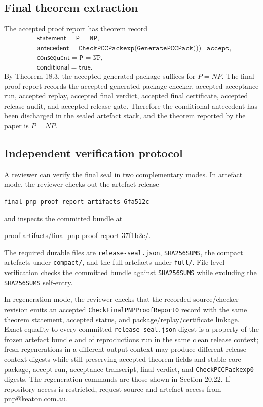 \documentclass[10.5pt,a4paper]{article}
\begin{document}
\subsection{Final theorem extraction}
The accepted proof report has theorem record
\[
\begin{aligned}
&\mathsf{statement}=\texttt{P = NP},\\
&\mathsf{antecedent}=\texttt{CheckPCCPackexp(GeneratePCCPack())=accept},\\
&\mathsf{consequent}=\texttt{P = NP},\\
&\mathsf{conditional}=\mathsf{true}.
\end{aligned}
\]
By Theorem 18.3, the accepted generated package suffices for \(P=NP\).  The final proof report records the accepted generated package checker, accepted acceptance run, accepted replay, accepted final verdict, accepted final certificate, accepted release audit, and accepted release gate.  Therefore the conditional antecedent has been discharged in the sealed artefact stack, and the theorem reported by the paper is \(P=NP\).

\subsection{Independent verification protocol}
A reviewer can verify the final seal in two complementary modes.  In artefact mode, the reviewer checks out the artefact release
\begin{center}
\texttt{final-pnp-proof-report-artifacts-6fa512c}
\end{center}
and inspects the committed bundle at
\begin{center}
\url{proof-artifacts/final-pnp-proof-report-37f1b2e/}.
\end{center}
The required durable files are \texttt{release-seal.json}, \texttt{SHA256SUMS}, the compact artefacts under \texttt{compact/}, and the full artefacts under \texttt{full/}.  File-level verification checks the committed bundle against \texttt{SHA256SUMS} while excluding the \texttt{SHA256SUMS} self-entry.

In regeneration mode, the reviewer checks that the recorded source/checker revision emits an accepted \texttt{CheckFinalPNPProofReport0} record with the same theorem statement, accepted status, and package/replay/certificate linkage.  Exact equality to every committed \texttt{release-seal.json} digest is a property of the frozen artefact bundle and of reproductions run in the same clean release context; fresh regenerations in a different output context may produce different release-context digests while still preserving accepted theorem fields and stable core package, accept-run, acceptance-transcript, final-verdict, and \texttt{CheckPCCPackexp0} digests.  The regeneration commands are those shown in Section 20.22.  If repository access is restricted, request source and artefact access from \href{mailto:pnp@keaton.com.au}{pnp@keaton.com.au}.
\end{document}
